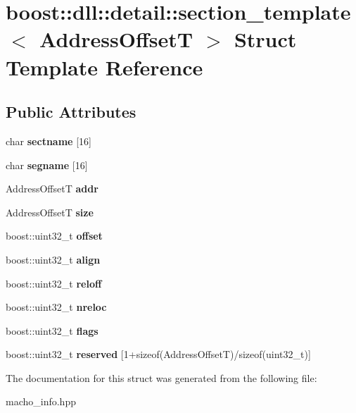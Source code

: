 \hypertarget{a00264}{}\section{boost\+:\+:dll\+:\+:detail\+:\+:section\+\_\+template$<$ Address\+OffsetT $>$ Struct Template Reference}
\label{a00264}
\subsection*{Public Attributes}
\begin{DoxyCompactItemize}
\item 
char {\bfseries sectname} \mbox{[}16\mbox{]}\hypertarget{a00264_a8b501f770cc1ee98b714b7cf9cdd8f34}{}\label{a00264_a8b501f770cc1ee98b714b7cf9cdd8f34}

\item 
char {\bfseries segname} \mbox{[}16\mbox{]}\hypertarget{a00264_a61ccd03628bd8f07c658ed757b4e0b4d}{}\label{a00264_a61ccd03628bd8f07c658ed757b4e0b4d}

\item 
Address\+OffsetT {\bfseries addr}\hypertarget{a00264_ae104edfac24b395a89aef36f944ef821}{}\label{a00264_ae104edfac24b395a89aef36f944ef821}

\item 
Address\+OffsetT {\bfseries size}\hypertarget{a00264_a4ba550b54c2203ec5db0dc4c57a6b815}{}\label{a00264_a4ba550b54c2203ec5db0dc4c57a6b815}

\item 
boost\+::uint32\+\_\+t {\bfseries offset}\hypertarget{a00264_a6e71953aad1c9b6a6ddeccefbeadfb29}{}\label{a00264_a6e71953aad1c9b6a6ddeccefbeadfb29}

\item 
boost\+::uint32\+\_\+t {\bfseries align}\hypertarget{a00264_a310eedf4a7240faa70c674310da293c1}{}\label{a00264_a310eedf4a7240faa70c674310da293c1}

\item 
boost\+::uint32\+\_\+t {\bfseries reloff}\hypertarget{a00264_a50213c30eaf442405471a3806ea32aad}{}\label{a00264_a50213c30eaf442405471a3806ea32aad}

\item 
boost\+::uint32\+\_\+t {\bfseries nreloc}\hypertarget{a00264_aa5c8851e07eee5390e78650ca86e06a8}{}\label{a00264_aa5c8851e07eee5390e78650ca86e06a8}

\item 
boost\+::uint32\+\_\+t {\bfseries flags}\hypertarget{a00264_a8c51bc2ae0b5c85f22cbc00d508f3316}{}\label{a00264_a8c51bc2ae0b5c85f22cbc00d508f3316}

\item 
boost\+::uint32\+\_\+t {\bfseries reserved} \mbox{[}1+sizeof(Address\+OffsetT)/sizeof(uint32\+\_\+t)\mbox{]}\hypertarget{a00264_ac077492c8b6694c4514290449c354917}{}\label{a00264_ac077492c8b6694c4514290449c354917}

\end{DoxyCompactItemize}


The documentation for this struct was generated from the following file\+:\begin{DoxyCompactItemize}
\item 
macho\+\_\+info.\+hpp\end{DoxyCompactItemize}
